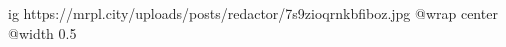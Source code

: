  
 
 
 
 

\ifcmt
  ig https://mrpl.city/uploads/posts/redactor/7s9zioqrnkbfiboz.jpg
  @wrap center
  @width 0.5
\fi
